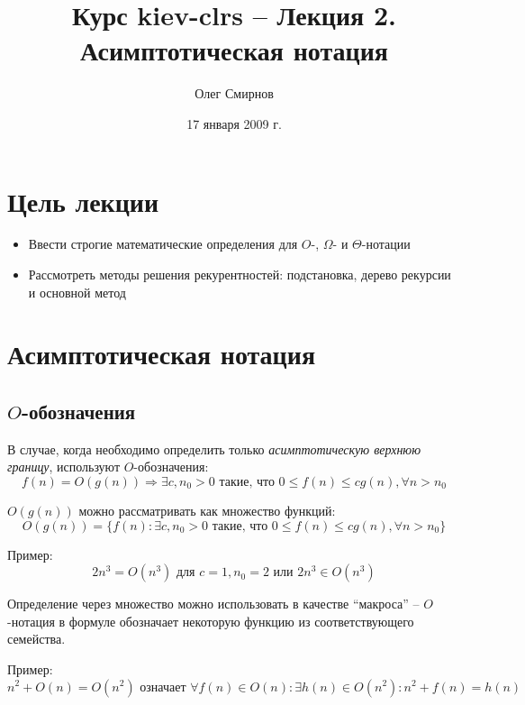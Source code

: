 \documentclass[11pt]{article}
\author{Олег Смирнов}
\title{Курс kiev-clrs -- Лекция 2. Асимптотическая нотация}
\date{17 января 2009 г.}
\begin{document}
\maketitle
\tableofcontents

\newpage
\setlength{\parskip}{1ex plus 0.5ex minus 0.2ex}
\section{Цель лекции}
\begin{itemize}
\item Ввести строгие математические определения для $O$-, $\Omega$- и $\Theta$-нотации 
\item Рассмотреть методы решения рекурентностей: подстановка, дерево рекурсии и основной метод
\end{itemize}

\section{Асимптотическая нотация}

\subsection{$O$-обозначения}
В случае, когда необходимо определить только \emph{асимптотическую верхнюю границу}, используют $O$-обозначения:
\begin{equation*}
  f(n) = O(g(n)) \Rightarrow \exists c, n_0 > 0 \text{ такие, что }
  0 \leqslant f(n) \leqslant c g(n), \forall n > n_0
\end{equation*}

$O(g(n))$ можно рассматривать как множество функций:
\begin{equation*}
  O(g(n)) = \{f(n): \exists c, n_0 > 0 \text{ такие, что }
  0 \leqslant f(n) \leqslant c g(n), \forall n > n_0
  \}
\end{equation*}

Пример:
\begin{equation*}
  2n^3 = O(n^3) \text{ для } c = 1, n_0 = 2 \text{ или } 2n^3 \in O(n^3)
\end{equation*}

Определение через множество можно использовать в качестве ``макроса''
-- $O$-нотация в формуле обозначает некоторую функцию из соответствующего семейства.

Пример:
\begin{equation*}
  n^2 + O(n) = O(n^2) \text{ означает } \forall f(n) \in O(n): \exists h(n) \in O(n^2): n^2 + f(n) = h(n)
\end{equation*}
\end{document}
